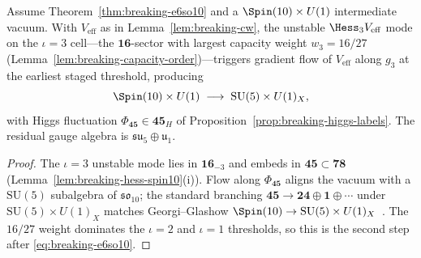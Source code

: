 \begin{theorem}\label{thm:breaking-so10su5}
Assume Theorem~\ref{thm:breaking-e6so10} and a $\Spin(10)\times U(1)$
intermediate vacuum. With $V_{\mathrm{eff}}$ as in Lemma~\ref{lem:breaking-cw},
the unstable $\Hess_3 V_{\mathrm{eff}}$ mode on the $\iota=3$ cell---the
$\mathbf{16}$-sector with largest capacity weight $w_3=16/27$
(Lemma~\ref{lem:breaking-capacity-order})---triggers gradient flow of
$V_{\mathrm{eff}}$ along $g_3$ at the earliest staged threshold, producing
\begin{equation}\label{eq:breaking-so10su5}
  \Spin(10)\times U(1)\;\longrightarrow\;\mathrm{SU}(5)\times U(1)_X,
\end{equation}
with Higgs fluctuation $\Phi_{\mathbf{45}}\in\mathbf{45}_H$ of
Proposition~\ref{prop:breaking-higgs-labels}. The residual gauge algebra is
$\mathfrak{su}_5\oplus\mathfrak{u}_1$.
\end{theorem}

\begin{proof}
The $\iota=3$ unstable mode lies in $\mathbf{16}_{-3}$ and embeds in
$\mathbf{45}\subset\mathbf{78}$ (Lemma~\ref{lem:breaking-hess-spin10}(i)).
Flow along $\Phi_{\mathbf{45}}$ aligns the vacuum with a $\mathrm{SU}(5)$
subalgebra of $\mathfrak{so}_{10}$; the standard branching
$\mathbf{45}\to\mathbf{24}\oplus\mathbf{1}\oplus\cdots$ under
$\mathrm{SU}(5)\times U(1)_X$ matches Georgi--Glashow
$\Spin(10)\to\mathrm{SU}(5)\times U(1)_X$~\cite{GeorgiGlashow1974}. The
$16/27$ weight dominates the $\iota=2$ and $\iota=1$ thresholds, so this is
the second step after \eqref{eq:breaking-e6so10}.
\end{proof}

